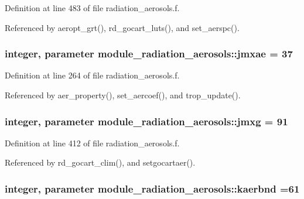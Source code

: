Definition at line 483 of file radiation\+\_\+aerosols.\+f.



Referenced by aeropt\+\_\+grt(), rd\+\_\+gocart\+\_\+luts(), and set\+\_\+aerspc().

\subsubsection[{\texorpdfstring{jmxae}{jmxae}}]{\setlength{\rightskip}{0pt plus 5cm}integer, parameter module\+\_\+radiation\+\_\+aerosols\+::jmxae = 37\hspace{0.3cm}{\ttfamily [private]}}\hypertarget{group__module__radiation__aerosols_gafdfdd058364062349b02cec9c712ea80}{}\label{group__module__radiation__aerosols_gafdfdd058364062349b02cec9c712ea80}


Definition at line 264 of file radiation\+\_\+aerosols.\+f.



Referenced by aer\+\_\+property(), set\+\_\+aercoef(), and trop\+\_\+update().

\subsubsection[{\texorpdfstring{jmxg}{jmxg}}]{\setlength{\rightskip}{0pt plus 5cm}integer, parameter module\+\_\+radiation\+\_\+aerosols\+::jmxg = 91\hspace{0.3cm}{\ttfamily [private]}}\hypertarget{group__module__radiation__aerosols_ga816ee06781e63adf8752a9a67ab2da2d}{}\label{group__module__radiation__aerosols_ga816ee06781e63adf8752a9a67ab2da2d}


Definition at line 412 of file radiation\+\_\+aerosols.\+f.



Referenced by rd\+\_\+gocart\+\_\+clim(), and setgocartaer().

\subsubsection[{\texorpdfstring{kaerbnd}{kaerbnd}}]{\setlength{\rightskip}{0pt plus 5cm}integer, parameter module\+\_\+radiation\+\_\+aerosols\+::kaerbnd =61\hspace{0.3cm}{\ttfamily [private]}}\hypertarget{group__module__radiation__aerosols_gad345c77fc29d8b02de34990162645a66}{}\label{group__module__radiation__aerosols_gad345c77fc29d8b02de34990162645a66}


